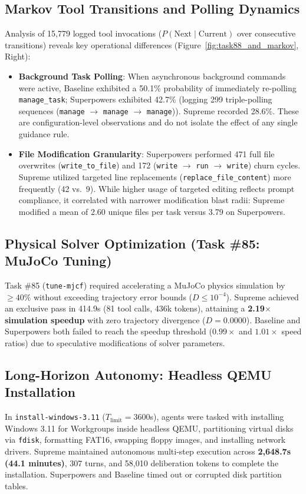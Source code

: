 \subsection{Markov Tool Transitions and Polling Dynamics}
Analysis of 15,779 logged tool invocations ($P(\text{Next} \mid \text{Current})$ over consecutive transitions) reveals key operational differences (Figure~\ref{fig:task88_and_markov}, Right):
\begin{itemize}
    \item \textbf{Background Task Polling}: When asynchronous background commands were active, Baseline exhibited a 50.1\% probability of immediately re-polling \texttt{manage\_task}; Superpowers exhibited 42.7\% (logging 299 triple-polling sequences (\texttt{manage} $\rightarrow$ \texttt{manage} $\rightarrow$ \texttt{manage})). Supreme recorded 28.6\%. These are configuration-level observations and do not isolate the effect of any single guidance rule.
    \item \textbf{File Modification Granularity}: Superpowers performed 471 full file overwrites (\texttt{write\_to\_file}) and 172 (\texttt{write} $\rightarrow$ \texttt{run} $\rightarrow$ \texttt{write}) churn cycles. Supreme utilized targeted line replacements (\texttt{replace\_file\_content}) more frequently (42 vs.\ 9). While higher usage of targeted editing reflects prompt compliance, it correlated with narrower modification blast radii: Supreme modified a mean of 2.60 unique files per task versus 3.79 on Superpowers.
\end{itemize}

\subsection{Physical Solver Optimization (Task \#85: MuJoCo Tuning)}
Task \#85 (\texttt{tune-mjcf}) required accelerating a MuJoCo physics simulation \cite{todorov2012mujoco} by $\ge 40\%$ without exceeding trajectory error bounds ($D \le 10^{-4}$). Supreme achieved an exclusive pass in 414.9s (81 tool calls, 436k tokens), attaining a \textbf{2.19$\times$ simulation speedup} with zero trajectory divergence ($D = 0.0000$). Baseline and Superpowers both failed to reach the speedup threshold ($0.99\times$ and $1.01\times$ speed ratios) due to speculative modifications of solver parameters.

\subsection{Long-Horizon Autonomy: Headless QEMU Installation}
In \texttt{install-windows-3.11} ($T_{\text{limit}} = 3600$s), agents were tasked with installing Windows 3.11 for Workgroups inside headless QEMU, partitioning virtual disks via \texttt{fdisk}, formatting FAT16, swapping floppy images, and installing network drivers. Supreme maintained autonomous multi-step execution across \textbf{2,648.7s (44.1 minutes)}, 307 turns, and 58,010 deliberation tokens to complete the installation. Superpowers and Baseline timed out or corrupted disk partition tables.

